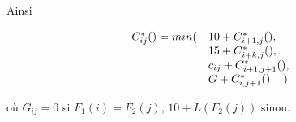 \documentclass[a4paper, 10pt, french]{article}
\begin{document}
Ainsi

$$\begin{array}{rll}
C^*_{ij}() = min ( & 10 + C^*_{i+1,j}(),\\
& 15 + C^*_{i+k,j}(),\\
& c_{ij} + C^*_{i+1,j+1}(),\\
& G + C^*_{i,j+1}() \hspace{4mm} )
\end{array}$$

où $G_{ij} = 0$ si $F_1(i) = F_2(j)$, $10 + L(F_2(j))$ sinon.

\end{document}
